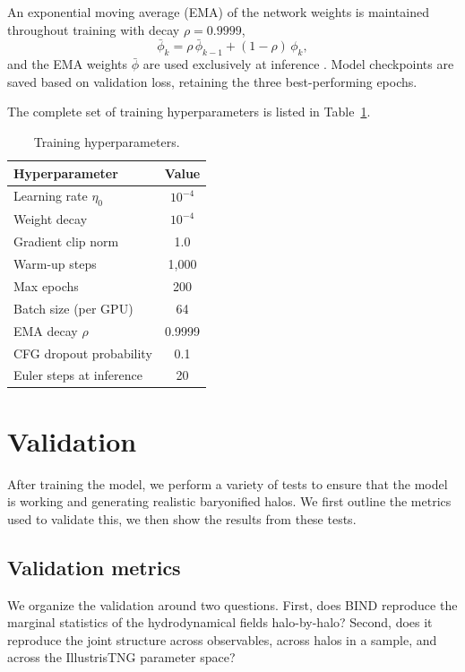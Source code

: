 \documentclass[linenumbers,trackchanges, twocolumn]{aastex701}
\begin{document}
An exponential moving average (EMA) of the network weights is
maintained throughout training with decay $\rho = 0.9999$,
\begin{equation}
    \bar{\phi}_k = \rho\,\bar{\phi}_{k-1} + (1-\rho)\,\phi_k,
    \label{eq:ema}
\end{equation}
and the EMA weights $\bar{\phi}$ are used exclusively at inference
\citep{karras2022edm}. Model checkpoints are saved based on validation
loss, retaining the three best-performing epochs.

The complete set of training hyperparameters is listed in
Table~\ref{tab:training}.

\begin{table}
\centering
\caption{Training hyperparameters.}
\label{tab:training}
\begin{tabular}{lc}
\hline
Hyperparameter & Value \\
\hline
Learning rate $\eta_0$      & $10^{-4}$ \\
Weight decay                & $10^{-4}$ \\
Gradient clip norm          & 1.0 \\
Warm-up steps               & 1{,}000 \\
Max epochs                  & 200 \\
Batch size (per GPU)        & 64 \\
EMA decay $\rho$            & 0.9999 \\
CFG dropout probability     & 0.1 \\
Euler steps at inference    & 20 \\
\hline
\end{tabular}
\end{table}

\section{Validation}
After training the model, we perform a variety of tests to ensure that the model is working and generating realistic baryonified halos. We first outline the metrics used to validate this, we then show the results from these tests.

\subsection{Validation metrics}
\label{subsec:validation_metrics}

We organize the validation around two questions. First, does \textsc{BIND} reproduce the marginal statistics of the hydrodynamical fields halo-by-halo? Second, does it reproduce the joint structure across observables, across halos in a sample, and across the IllustrisTNG parameter space?
\end{document}
